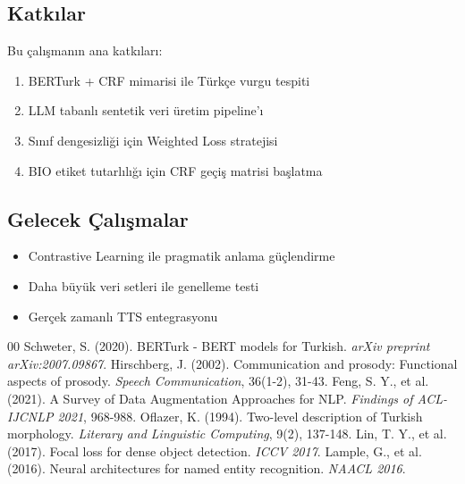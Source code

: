 \documentclass[conference]{IEEEtran}
\begin{document}
\subsection{Katkılar}
Bu çalışmanın ana katkıları:
\begin{enumerate}
    \item BERTurk + CRF mimarisi ile Türkçe vurgu tespiti
    \item LLM tabanlı sentetik veri üretim pipeline'ı
    \item Sınıf dengesizliği için Weighted Loss stratejisi
    \item BIO etiket tutarlılığı için CRF geçiş matrisi başlatma
\end{enumerate}

\subsection{Gelecek Çalışmalar}
\begin{itemize}
    \item Contrastive Learning ile pragmatik anlama güçlendirme
    \item Daha büyük veri setleri ile genelleme testi
    \item Gerçek zamanlı TTS entegrasyonu
\end{itemize}

\begin{thebibliography}{00}
 Schweter, S. (2020). BERTurk - BERT models for Turkish. \textit{arXiv preprint arXiv:2007.09867}.
 Hirschberg, J. (2002). Communication and prosody: Functional aspects of prosody. \textit{Speech Communication}, 36(1-2), 31-43.
 Feng, S. Y., et al. (2021). A Survey of Data Augmentation Approaches for NLP. \textit{Findings of ACL-IJCNLP 2021}, 968-988.
 Oflazer, K. (1994). Two-level description of Turkish morphology. \textit{Literary and Linguistic Computing}, 9(2), 137-148.
 Lin, T. Y., et al. (2017). Focal loss for dense object detection. \textit{ICCV 2017}.
 Lample, G., et al. (2016). Neural architectures for named entity recognition. \textit{NAACL 2016}.
\end{thebibliography}


\newpage
\onecolumn  %

\end{document}
